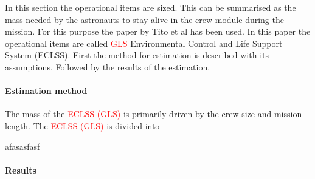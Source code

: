 In this section the operational items are sized. This can be summarised as the mass needed by the astronauts to stay alive in the crew module during the mission. For this purpose the paper by Tito et al \cite{tito2013} has been used. In this paper the operational items are called \textcolor{red}{GLS} Environmental Control and Life Support System (ECLSS). First the method for estimation is described with its assumptions. Followed by the results of the estimation.

\paragraph{Estimation method}
The mass of the \textcolor{red}{ECLSS (GLS)} is primarily driven by the crew size and mission length. The \textcolor{red}{ECLSS (GLS)} is divided into 





afasasfasf
\paragraph{Results}



